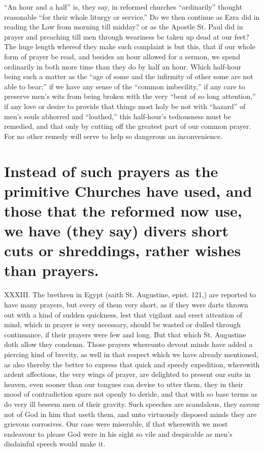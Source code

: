 “An hour and a half” is, they say, in reformed churches “ordinarily” thought reasonable “for their whole liturgy or service.” Do we then continue as Ezra did in reading the Law from morning till midday? or as the Apostle St. Paul did in prayer and preaching till men through weariness be taken up dead at our feet? The huge length whereof they make such complaint is but this, that if our whole form of prayer be read, and besides an hour allowed for a sermon, we spend ordinarily in both more time than they do by half an hour. Which half-hour being such a  matter as the “age of some and the infirmity of other some are not able to bear;” if we have any sense of the “common imbecility,” if any care to preserve men’s wits from being broken with the very “bent of so long attention,” if any love or desire to provide that things most holy be not with “hazard” of men’s souls abhorred and “loathed,” this half-hour’s tediousness must be remedied, and that only by cutting off the greatest part of our common prayer. For no other remedy will serve to help so dangerous an inconvenience.

\section*{Instead of such prayers as the primitive Churches have used, and those that the reformed now use, we have (they say) divers short cuts or shreddings, rather wishes than prayers.}
XXXIII. The brethren in Egypt (saith St. Augustine, epist. 121,) are reported to have many prayers, but every of them very short, as if they were darts thrown out with a kind of sudden quickness, lest that vigilant and erect attention of mind, which in prayer is very necessary, should be wasted or dulled through continuance, if their prayers were few and long. But that which St. Augustine doth allow they  condemn. Those prayers whereunto devout minds have added a piercing kind of brevity, as well in that respect which we have already mentioned, as also thereby the better to express that quick and speedy expedition, wherewith ardent affections, the very wings of prayer, are delighted to present our suits in heaven, even sooner than our tongues can devise to utter them, they in their mood of contradiction spare not openly to deride, and that with so base terms as do very ill beseem men of their gravity. Such speeches are scandalous, they savour not of God in him that useth them, and unto virtuously disposed minds they are grievous corrosives. Our case were miserable, if that wherewith we most endeavour to please God were in his sight so vile and despicable as men’s disdainful speech would make it.

